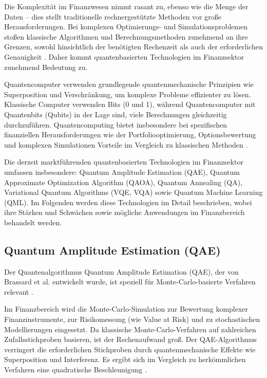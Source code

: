 Die Komplexität im Finanzwesen nimmt rasant zu, ebenso wie die Menge der Daten – dies stellt traditionelle rechnergestützte Methoden vor große Herausforderungen. Bei komplexen Optimierungs- und Simulationsproblemen stoßen klassische Algorithmen und Berechnungsmethoden zunehmend an ihre Grenzen, sowohl hinsichtlich der benötigten Rechenzeit als auch der erforderlichen Genauigkeit \cite{plos2024,bouland2020}. Daher kommt quantenbasierten Technologien im Finanzsektor zunehmend Bedeutung zu.

Quantencomputer verwenden grundlegende quantenmechanische Prinzipien wie Superposition und Verschränkung, um komplexe Probleme effizienter zu lösen. Klassische Computer verwenden Bits (0 und 1), während Quantencomputer mit Quantenbits (Qubits) in der Lage sind, viele Berechnungen gleichzeitig durchzuführen. Quantencomputing bietet insbesondere bei spezifischen finanziellen Herausforderungen wie der Portfoliooptimierung, Optionsbewertung und komplexen Simulationen Vorteile im Vergleich zu klassischen Methoden \cite{orus2019,bouland2020,martin2022}.

Die derzeit marktführenden quantenbasierten Technologien im Finanzsektor umfassen insbesondere:
Quantum Amplitude Estimation (QAE), Quantum Approximate Optimization Algorithm (QAOA), Quantum Annealing (QA), Variational Quantum Algorithms (VQE, VQA) sowie Quantum Machine Learning (QML). Im Folgenden werden diese Technologien im Detail beschrieben, wobei ihre Stärken und Schwächen sowie mögliche Anwendungen im Finanzbereich behandelt werden.

\subsection{Quantum Amplitude Estimation (QAE)}

Der Quantenalgorithmus Quantum Amplitude Estimation (QAE), der von Brassard et al. entwickelt wurde, ist speziell für Monte-Carlo-basierte Verfahren relevant \cite{quantumjournal2020,rebentrost2018}.

Im Finanzbereich wird die Monte-Carlo-Simulation zur Bewertung komplexer Finanzinstrumente, zur Risikomessung (wie Value at Risk) und zu stochastischen Modellierungen eingesetzt. Da klassische Monte-Carlo-Verfahren auf zahlreichen Zufallsstichproben basieren, ist der Rechenaufwand groß. Der QAE-Algorithmus verringert die erforderlichen Stichproben durch quantenmechanische Effekte wie Superposition und Interferenz. Es ergibt sich im Vergleich zu herkömmlichen Verfahren eine quadratische Beschleunigung \cite{quantumjournal2020,rebentrost2018,martin2022}.

